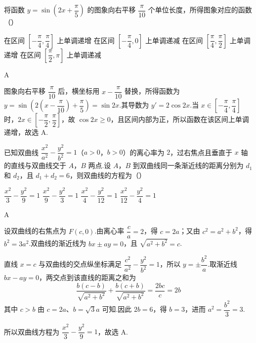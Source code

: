 \begin{problem}
将函数 \(y=\sin\!\left(2x+\dfrac{\pi}{5}\right)\) 的图象向右平移 \(\dfrac{\pi}{10}\) 个单位长度，所得图象对应的函数（\quad）

\choices
    {在区间 \(\left[-\dfrac{\pi}{4},\dfrac{\pi}{4}\right]\) 上单调递增}
    {在区间 \(\left[-\dfrac{\pi}{4},0\right]\) 上单调递减}
    {在区间 \(\left[\dfrac{\pi}{4},\dfrac{\pi}{2}\right]\) 上单调递增}
    {在区间 \(\left[\dfrac{\pi}{2},\pi\right]\) 上单调递减}
\end{problem}

\begin{answer}
A
\end{answer}

\begin{solution}
图象向右平移 \(\dfrac{\pi}{10}\) 后，横坐标用 \(x-\dfrac{\pi}{10}\) 替换，所得函数为
\(y=\sin\!\left(2\left(x-\dfrac{\pi}{10}\right)+\dfrac{\pi}{5}\right)=\sin2x\).其导数为 \(y'=2\cos2x\).当 \(x\in\left[-\dfrac{\pi}{4},\dfrac{\pi}{4}\right]\) 时，\(2x\in\left[-\dfrac{\pi}{2},\dfrac{\pi}{2}\right]\)，故 \(\cos2x\ge0\)，且区间内部为正，所以函数在该区间上单调递增，故选 A.
\end{solution}

\begin{problem}
已知双曲线 \(\dfrac{x^2}{a^2}-\dfrac{y^2}{b^2}=1\)（\(a>0\)，\(b>0\)）的离心率为 \(2\)，过右焦点且垂直于 \(x\) 轴的直线与双曲线交于 \(A\)，\(B\) 两点.设 \(A\)，\(B\) 到双曲线同一条渐近线的距离分别为 \(d_1\) 和 \(d_2\)，且 \(d_1+d_2=6\)，则双曲线的方程为（\quad）

\choices
    {\(\dfrac{x^2}{3}-\dfrac{y^2}{9}=1\)}
    {\(\dfrac{x^2}{9}-\dfrac{y^2}{3}=1\)}
    {\(\dfrac{x^2}{4}-\dfrac{y^2}{12}=1\)}
    {\(\dfrac{x^2}{12}-\dfrac{y^2}{4}=1\)}
\end{problem}

\begin{answer}
A
\end{answer}

\begin{solution}
设双曲线的右焦点为 \(F(c,0)\).由离心率 \(\dfrac ca=2\)，得 \(c=2a\)；又由 \(c^2=a^2+b^2\)，得 \(b^2=3a^2\).双曲线的渐近线为 \(bx\pm ay=0\)，且 \(\sqrt{a^2+b^2}=c\).

直线 \(x=c\) 与双曲线的交点纵坐标满足
\(\dfrac{c^2}{a^2}-\dfrac{y^2}{b^2}=1\)，所以 \(y=\pm\dfrac{b^2}{a}\).取渐近线 \(bx-ay=0\)，两交点到该直线的距离之和为
\[
\frac{b(c-b)}{\sqrt{a^2+b^2}}+\frac{b(c+b)}{\sqrt{a^2+b^2}}=\frac{2bc}{c}=2b
\]
其中 \(c>b\) 由 \(c=2a\)、\(b=\sqrt3a\) 可知.因此 \(2b=6\)，得 \(b=3\)，进而 \(a^2=\dfrac{b^2}{3}=3\).

所以双曲线方程为 \(\dfrac{x^2}{3}-\dfrac{y^2}{9}=1\)，故选 A.
\end{solution}

